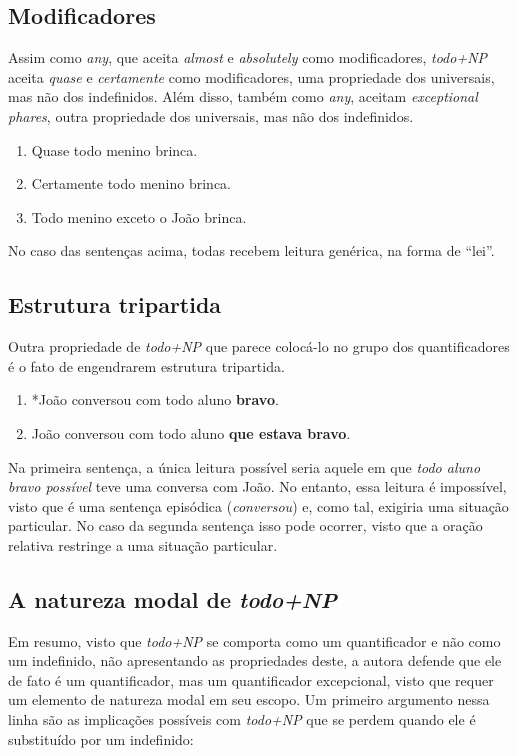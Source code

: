 \subsection{Modificadores}
Assim como \emph{any}, que aceita \emph{almost} e \emph{absolutely} como modificadores, \emph{todo+NP} aceita \emph{quase} e \emph{certamente} como modificadores, uma propriedade dos universais, mas não dos indefinidos. Além disso, também como \emph{any}, aceitam \emph{exceptional phares}, outra propriedade dos universais, mas não dos indefinidos.

\begin{enumerate}[resume]
    \item Quase todo menino brinca.
    \item Certamente todo menino brinca.
    \item Todo menino exceto o João brinca.
\end{enumerate}

No caso das sentenças acima, todas recebem leitura genérica, na forma de ``lei''.

\subsection{Estrutura tripartida}
Outra propriedade de \emph{todo+NP} que parece colocá-lo no grupo dos quantificadores é o fato de engendrarem estrutura tripartida.

\begin{enumerate}[resume]
    \item *João conversou com todo aluno \textbf{bravo}.
    \item João conversou com todo aluno \textbf{que estava bravo}.
\end{enumerate}

Na primeira sentença, a única leitura possível seria aquele em que \emph{todo aluno bravo possível} teve uma conversa com João. No entanto, essa leitura é impossível, visto que é uma sentença episódica (\emph{conversou}) e, como tal, exigiria uma situação particular. No caso da segunda sentença isso pode ocorrer, visto que a oração relativa restringe a uma situação particular.

\subsection{A natureza modal de \emph{todo+NP}}
Em resumo, visto que \emph{todo+NP} se comporta como um quantificador e não como um indefinido, não apresentando as propriedades deste, a autora defende que ele de fato é um quantificador, mas um quantificador excepcional, visto que requer um elemento de natureza modal em seu escopo. Um primeiro argumento nessa linha são as implicações possíveis com \emph{todo+NP} que se perdem quando ele é substituído por um indefinido:

